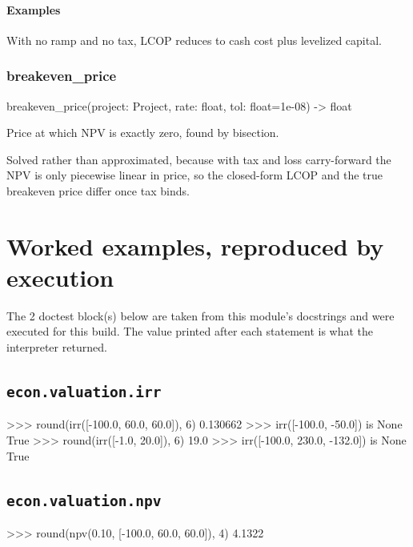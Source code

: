 \documentclass[10pt,a4paper,twoside]{report}
\begin{document}
\paragraph*{Examples}

With no ramp and no tax, LCOP reduces to cash cost plus levelized capital.

\subsubsection*{breakeven\_price}

\begin{verbatimsmall}
breakeven_price(project: Project, rate: float, tol: float=1e-08) -> float
\end{verbatimsmall}

Price at which NPV is exactly zero, found by bisection.

Solved rather than approximated, because with tax and loss carry-forward the NPV is only piecewise linear in price, so the closed-form LCOP and the true breakeven price differ once tax binds.

\section{Worked examples, reproduced by execution}

The 2 doctest block(s) below are taken from this module's docstrings and were executed for this build. The value printed after each statement is what the interpreter returned.

\subsection*{\texttt{econ.valuation.irr}}

\begin{doctestblock}
>>> round(irr([-100.0, 60.0, 60.0]), 6)
0.130662
>>> irr([-100.0, -50.0]) is None
True
>>> round(irr([-1.0, 20.0]), 6)
19.0
>>> irr([-100.0, 230.0, -132.0]) is None
True
\end{doctestblock}

\subsection*{\texttt{econ.valuation.npv}}

\begin{doctestblock}
>>> round(npv(0.10, [-100.0, 60.0, 60.0]), 4)
4.1322
\end{doctestblock}
\end{document}
